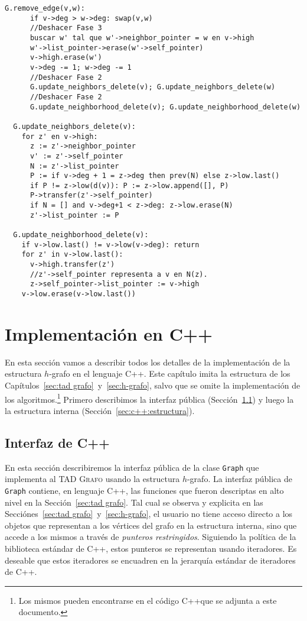 \documentclass[%
    a4paper,%
    fontsize=12pt,%
    DIV=12,
    twoside,%
    openright,%
    titlepage=true,%
    headsepline,%
    toc=bibliography,%
    parskip=half,%
    cleardoublepage=empty,%
    headings=big,%
]{scrbook}
\makeatletter
\newcommand{\Grafo}{\textsc{Grafo}\xspace}
\newcommand{\Code}[2][]{\lstinline[basicstyle={\ttfamily},#1]@#2@}
\newcommand{\CPPCode}[2][]{\lstinline[language=C++,basicstyle={\ttfamily},#1]@#2@}
\newcommand{\Graph}{\CPPCode{Graph}\xspace}
\DeclareRobustCommand{\CPP}{C\nolinebreak[4]\hspace{-.05em}\raisebox{.4ex}{\relsize{-3}\textbf{++}}\xspace}
\def\CPP{C++}%
\makeatother
\begin{document}
\begin{lstlisting}[caption={Implementación de \Code{remove_edge}.},name=remove_edge,gobble=2,float=ht,label={lst:pseudo:G.remove_edge}]
  G.remove_edge(v,w):
      if v->deg > w->deg: swap(v,w)
      //Deshacer Fase 3
      buscar w' tal que w'->neighbor_pointer = w en v->high
      w'->list_pointer->erase(w'->self_pointer)
      v->high.erase(w')
      v->deg -= 1; w->deg -= 1
      //Deshacer Fase 2
      G.update_neighbors_delete(v); G.update_neighbors_delete(w)
      //Deshacer Fase 2
      G.update_neighborhood_delete(v); G.update_neighborhood_delete(w)
  
  G.update_neighbors_delete(v):
    for z' en v->high:
      z := z'->neighbor_pointer
      v' := z'->self_pointer
      N := z'->list_pointer
      P := if v->deg + 1 = z->deg then prev(N) else z->low.last() 
      if P != z->low(d(v)): P := z->low.append([], P)
      P->transfer(z'->self_pointer)
      if N = [] and v->deg+1 < z->deg: z->low.erase(N)
      z'->list_pointer := P
  
  G.update_neighborhood_delete(v):
    if v->low.last() != v->low(v->deg): return
    for z' in v->low.last():
      v->high.transfer(z')
      //z'->self_pointer representa a v en N(z).
      z->self_pointer->list_pointer := v->high
    v->low.erase(v->low.last())
\end{lstlisting}


\chapter{Implementación en \CPP}
\label{sec:c++}

En esta sección vamos a describir todos los detalles de la implementación de la estructura $h$-grafo en el lenguaje \CPP.  Este capítulo imita la estructura de los Capítulos~\ref{sec:tad grafo}~y~\ref{sec:h-grafo}, salvo que se omite la implementación de los algoritmos.\footnote{Los mismos pueden encontrarse en el código \CPP que se adjunta a este documento.}  Primero describimos la interfaz pública (Sección~\ref{sec:c++:interfaz}) y luego la la estructura interna (Sección~\ref{sec:c++:estructura}).  


\section{Interfaz de \CPP}
\label{sec:c++:interfaz}

En esta sección describiremos la interfaz pública de la clase \Graph que implementa al TAD \Grafo usando la estructura $h$-grafo.  La interfaz pública de \Graph contiene, en lenguaje \CPP, las funciones que fueron descriptas en alto nivel en la Sección~\ref{sec:tad grafo}.
Tal cual se observa y explicita en las Secciónes~\ref{sec:tad grafo}~y~\ref{sec:h-grafo}, el usuario no tiene acceso directo a los objetos que representan a los vértices del grafo en la estructura interna, sino que accede a los mismos a través de \emph{punteros restringidos}.  Siguiendo la política de la biblioteca estándar de \CPP, estos punteros se representan usando iteradores.  Es deseable que estos iteradores se encuadren en la jerarquía estándar de iteradores de \CPP.
\end{document}
